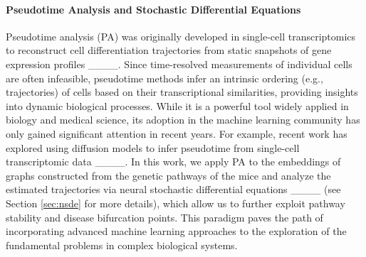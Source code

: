 \paragraph{Pseudotime Analysis and Stochastic Differential Equations}
Pseudotime analysis (PA) was originally developed in single-cell transcriptomics to reconstruct cell differentiation trajectories from static snapshots of gene expression profiles ____. Since time-resolved measurements of individual cells are often infeasible, pseudotime methods infer an intrinsic ordering (e.g., trajectories) of cells based on their transcriptional similarities, providing insights into dynamic biological processes. While it is a powerful tool widely applied in biology and medical science, its adoption in the machine learning community has only gained significant attention in recent years. For example, recent work has explored using diffusion models to infer pseudotime from single-cell transcriptomic data ____. In this work, we apply PA to the embeddings of graphs constructed from the genetic pathways of the mice and analyze the estimated trajectories via neural stochastic differential equations ____ (see Section \ref{sec:nsde} for more details), which allow us to further exploit pathway stability and disease bifurcation points. This paradigm paves the path of incorporating advanced machine learning approaches to the exploration of the fundamental problems in complex biological systems.














%